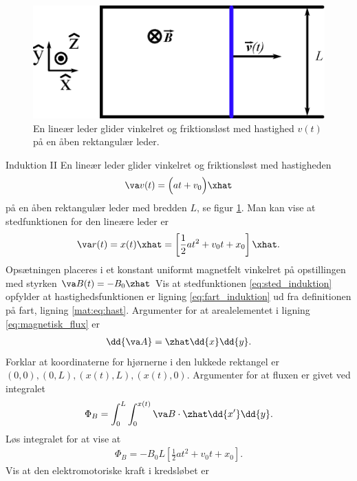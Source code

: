 \begin{figure}
    \centering
    \includegraphics[width=.65\columnwidth]{opg/figurer/induktion_ii.eps}
    \caption{En lineær leder glider vinkelret og friktionsløst med hastighed $v(t)$ på en åben rektangulær leder.}
    \label{fig:induktion_ii}
\end{figure}
\begin{opgave}{Induktion II}
    En lineær leder glider vinkelret og friktionsløst med hastigheden
    \begin{align} \label{eq:fart_induktion}
        \va v(t) = \Big(at + v_0\Big)\xhat
    \end{align}
    på en åben rektangulær leder med bredden $L$, se figur \ref{fig:induktion_ii}. Man kan vise at stedfunktionen for den lineære leder er
    \begin{align} \label{eq:sted_induktion}
        \va r(t) = x(t)\xhat = \left[\frac{1}{2}at^2 + v_0t + x_0\right]\xhat.
    \end{align}
    Opsætningen placeres i et konstant uniformt magnetfelt vinkelret på opstillingen med styrken $\va B(t) = -B_0 \zhat$
    \opg Vis at stedfunktionen \ref{eq:sted_induktion} opfylder at hastighedsfunktionen er ligning \ref{eq:fart_induktion} ud fra definitionen på fart, ligning \ref{mat:eq:hast}.
    \opg Argumenter for at arealelementet i ligning \ref{eq:magnetisk_flux} er
    \begin{align}
        \dd{\va A} = \zhat \dd{x}\dd{y}.
    \end{align}
    \opg Forklar at koordinaterne for hjørnerne i den lukkede rektangel er $(0,0),(0,L),(x(t),L),(x(t),0)$.
    \opg Argumenter for at fluxen er givet ved integralet
    \begin{align}
        \Phi_B = \int_0^L \int_0^{x(t)} \va B \cdot \zhat \dd{x'}\dd{y}.
    \end{align}
    \opg Løs integralet for at vise at
    \begin{align}
        \Phi_B = -B_0L\left[\frac{1}{2}at^2 + v_0t + x_0\right].
    \end{align}
    \opg Vis at den elektromotoriske kraft i kredsløbet er

\end{opgave}
